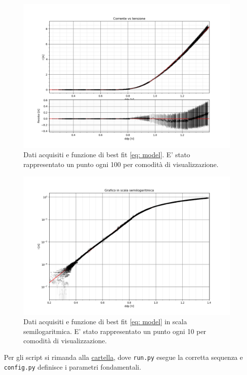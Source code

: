 \documentclass{article}[a4paper, oneside, 11pt]
\begin{document}
\begin{figure}[H]
	\centering 
 		\includegraphics[scale=0.5]{./Figure_4_1_Nskip_100.png}
	\caption{Dati acquisiti e funzione di best fit \eqref{eq: model}. E' stato rappresentato un punto ogni 100 per comodità di visualizzazione.}
\end{figure}


\begin{figure}[H]
	\centering 
 		\includegraphics[scale=0.6]{./Figure_3_1_Nskip_10.png}
	\caption{Dati acquisiti e funzione di best fit \eqref{eq: model} in scala semilogaritmica. E' stato rappresentato un punto ogni 10 per comodità di visualizzazione.}
\end{figure}

Per gli script si rimanda alla \href{https://github.com/LucaCiucci/relaz_seme/tree/master/Cartella_fit}{cartella}, dove \verb+run.py+ esegue la corretta sequenza e \verb+config.py+ definisce i parametri fondamentali.
\end{document}

